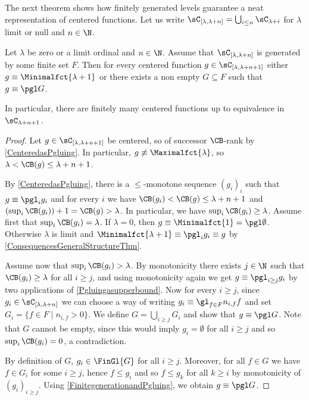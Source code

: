 
The next theorem shows how finitely generated levels guarantee a neat representation of centered functions. Let us write $\sC_{[\lambda,\lambda+n]}= \bigcup_{i\leq n} \sC_{\lambda +i}$ for $\lambda$ limit or null and $n\in\N$.


\begin{theorem}\label{finitenessofcenteredfunctions}
Let $\lambda$ be zero or a limit ordinal and $n\in\N$.
Assume that $\sC_{[\lambda,\lambda+n]}$ is generated by some finite set $F$.
Then for every centered function $g\in\sC_{[\lambda,\lambda+n+1]}$ either $g\equiv \Minimalfct{\lambda+1}$ or there exists a non empty $G\subseteq F$ such that $g\equiv\pgl G$. 

In particular, there are finitely many centered functions up to equivalence in $\sC_{\lambda+n+1}$.
\end{theorem}
\begin{proof}
Let $g \in \sC_{[\lambda,\lambda+n+1]}$ be centered, so of successor $\CB$-rank by \cref{CenteredasPgluing}.
In particular, $g\not\equiv\Maximalfct{\lambda}$, so $\lambda<\CB(g)\leq \lambda +n+1$.

By \cref{CenteredasPgluing}, there is a $\leq$-monotone sequence $(g_i)_i$ such that $g\equiv\pgl_ig_i$ and
for every $i$ we have $\CB(g_i)<\CB(g)\leq  \lambda +n+1$ and $(\sup_i \CB(g_i))+1=\CB(g)>\lambda$. In particular, we have $\sup_i \CB(g_i) \geq \lambda$.
Assume first that $\sup_i \CB(g_i) =\lambda$. If $\lambda=0$, then $g\equiv \Minimalfct{1}= \pgl \emptyset$. Otherwise $\lambda$ is limit and $\Minimalfct{\lambda+1} \equiv \pgl_i g_i \equiv g$ by \cref{ConsequencesGeneralStructureThm}. 

Assume now that $\sup_i \CB(g_i) > \lambda$. By monotonicity there exists $j\in \N$ such that $\CB(g_i)\geq \lambda$ for all $i\geq j$, and using monotonicity again
we get $g\equiv\pgl_{i\geq j} g_i$ by two applications of \cref{Pgluingasupperbound}.
Now for every $i\geq j$, since $g_i \in \sC_{[\lambda,\lambda+n]}$ we can choose a way of writing $g_i\equiv\gl_{f\in F}n_{i,f} f$  and set $G_i=\{f\in F \mid n_{i,f}>0\}$.
We define $G=\bigcup_{i\geq j}G_i$ and show that $g\equiv\pgl G$. Note that $G$ cannot be empty, since this would imply $g_i= \emptyset$ for all $i\geq j$ and so $\sup_i \CB(g_i)=0$, a contradiction.  

By definition of $G$, $g_i\in \FinGl{G}$ for all $i\geq j$. Moreover, for all $f\in G$ we have $f\in G_i$ for some $i\geq j$, hence $f\leq g_i$ and so $f\leq g_{k}$ for all $k\geq i$ by monotonicity of $(g_i)_{i\geq j}$. Using \cref{FinitegenerationandPgluing}, we obtain $g\equiv \pgl G$.
\end{proof}

